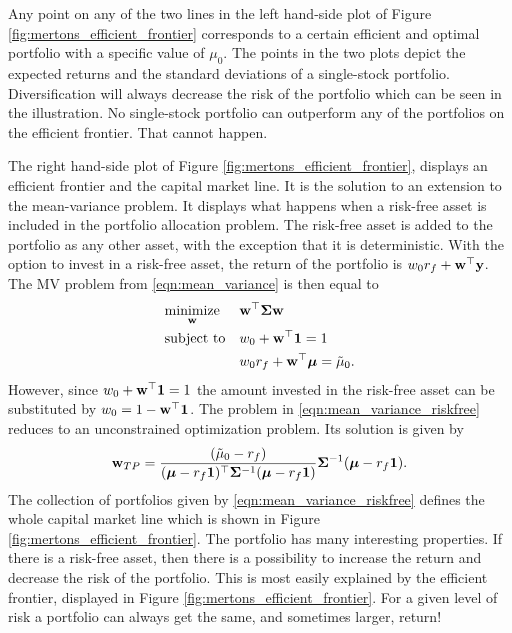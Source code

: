 \documentclass[12pt, oneside]{book}\usepackage{knitr}
\begin{document}
{\begin{knitrout}
\end{knitrout}
Any point on any of the two lines in the left hand-side plot of Figure \ref{fig:mertons_efficient_frontier} corresponds to a certain efficient and optimal portfolio with a specific value of $\mu_0$. 
The points in the two plots depict the expected returns and the standard deviations of a single-stock portfolio. 
Diversification will always decrease the risk of the portfolio which can be seen in the illustration. 
No single-stock portfolio can outperform any of the portfolios on the efficient frontier. 
That cannot happen. 

The right hand-side plot of Figure \ref{fig:mertons_efficient_frontier}, displays an efficient frontier and the capital market line.
It is the solution to an extension to the mean-variance problem.
It displays what happens when a risk-free asset is included in the portfolio allocation problem. 
The risk-free asset is added to the portfolio as any other asset, with the exception that it is deterministic.
With the option to invest in a risk-free asset, the return of the portfolio is $w_0 r_f + \mathbf{w}^\top \mathbf{y}$. 
The MV problem from \eqref{eqn:mean_variance} is then equal to
\begin{equation}\label{eqn:mean_variance_riskfree}
\begin{aligned}
& \underset{\mathbf{w}}{\text{minimize}} 
& & \mathbf{w}^\top \mathbf{\Sigma} \mathbf{w} \\
& \text{subject to}
& & w_0 + \mathbf{w}^\top \mathbf{1} = 1 \\
& && w_0 r_f + \mathbf{w}^\top \mbox{\boldmath$\mu$} = \tilde\mu_0. \\
\end{aligned}
\end{equation}
However, since $w_0 + \mathbf{w}^\top \mathbf{1}=1$ the amount invested in the risk-free asset can be substituted by $w_0=1-\mathbf{w}^\top \mathbf{1}$.
The problem in \eqref{eqn:mean_variance_riskfree} reduces to an unconstrained optimization problem. 
Its solution is given by 
\begin{equation}\label{eqn:w_mean_variance_riskfree}
  \mathbf{w}_{TP} = \frac{(\tilde\mu_0-r_f)}{(\mbox{\boldmath$\mu$}-r_f \mathbf{1})^\top \mathbf{\Sigma}^{-1} (\mbox{\boldmath$\mu$}-r_f \mathbf{1})} \mathbf{\Sigma}^{-1} (\mbox{\boldmath$\mu$}-r_f \mathbf{1}).
\end{equation}
The collection of portfolios given by \eqref{eqn:mean_variance_riskfree} defines the whole capital market line which is shown in Figure \ref{fig:mertons_efficient_frontier}. 
The portfolio has many interesting properties. 
If there is a risk-free asset, then there is a possibility to increase the return and decrease the risk of the portfolio. 
This is most easily explained by the efficient frontier, displayed in Figure \ref{fig:mertons_efficient_frontier}. 
For a given level of risk a portfolio can always get the same, and sometimes larger, return! 

}
\end{document}
